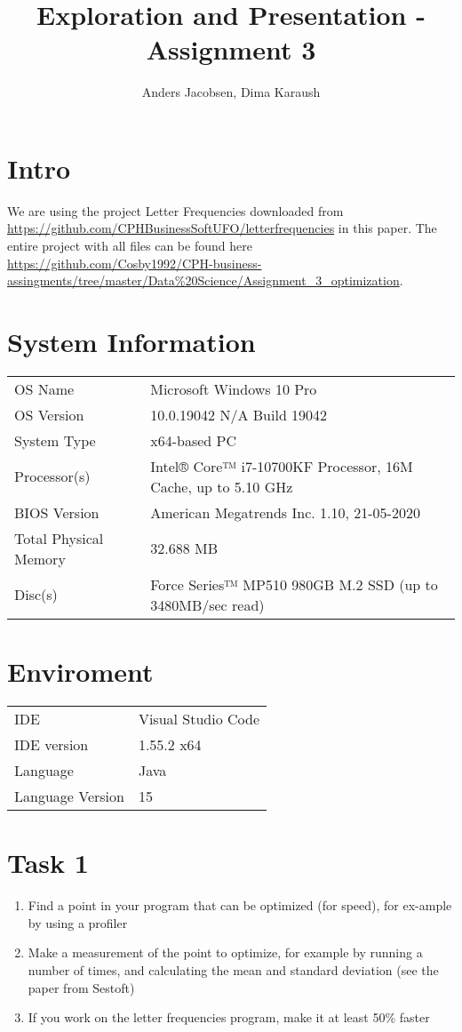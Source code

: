 \documentclass{article}
\author{Anders Jacobsen, Dima Karaush}
\title{Exploration and Presentation - Assignment 3}
\begin{document}
\maketitle

\newpage
\tableofcontents

\newpage
\section*{Intro}
We are using the project Letter Frequencies downloaded 
from \url{https://github.com/CPHBusinessSoftUFO/letterfrequencies} 
in this paper. The entire project with all files can be found here 
\url{https://github.com/Cosby1992/CPH-business-assingments/tree/master/Data%20Science/Assignment_3_optimization}.

\section*{System Information}
\begin{tabular}{ l l }
OS Name                 & Microsoft Windows 10 Pro \\ 
OS Version              & 10.0.19042 N/A Build 19042 \\  
System Type             & x64-based PC \\
Processor(s)            & Intel® Core™ i7-10700KF Processor, 16M Cache, up to 5.10 GHz \\
BIOS Version            & American Megatrends Inc. 1.10, 21-05-2020 \\
Total Physical Memory   & 32.688 MB \\ 
Disc(s)                 & Force Series™ MP510 980GB M.2 SSD (up to 3480MB/sec read)
\end{tabular}

\section*{Enviroment}
\begin{tabular}{ l l }
IDE                     & Visual Studio Code \\ 
IDE version             & 1.55.2 x64 \\  
Language                & Java \\
Language Version        & 15 \\
\end{tabular}

\section{Task 1}
\begin{enumerate}
    \item Find a point in your program that can be optimized (for speed), 
    for ex-ample by using a profiler
    \item Make a measurement of the point to optimize, for example by 
    running a number of times, and calculating the mean and standard 
    deviation (see the paper from Sestoft)
    \item If you work on the letter frequencies program, make it at least 50\% faster
\end{enumerate}
\end{document}

